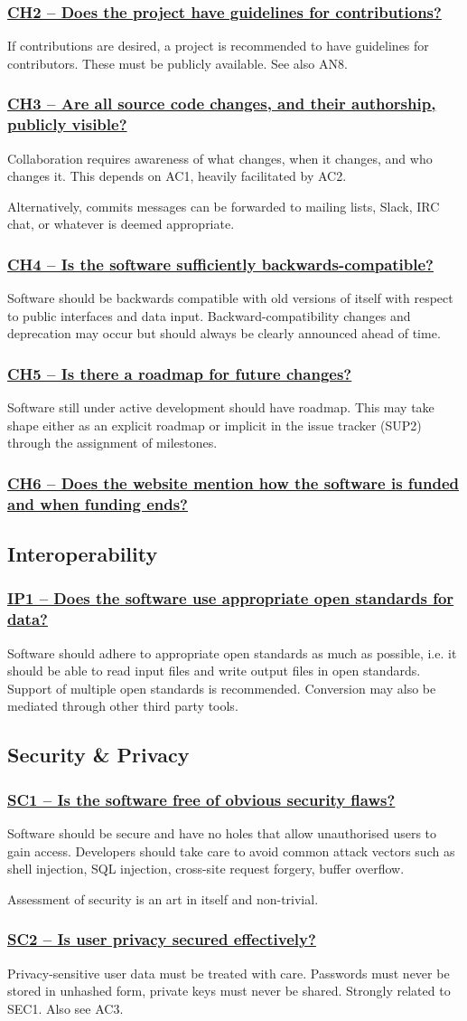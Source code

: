 \documentclass[a4paper,11pt]{article}
\newcommand{\criterion}[1]{\subsubsection*{\underline{#1}}}
\begin{document}
\criterion{CH2 -- Does the project have guidelines for contributions?}

If contributions are desired, a project is recommended to have guidelines for
contributors. These must be publicly available.
See also AN8.

\criterion{CH3 -- Are all source code changes, and their authorship, publicly visible?} 

Collaboration requires awareness of what changes, when it changes, and who
changes it. This depends on AC1, heavily facilitated by AC2.

Alternatively, commits messages can be forwarded to mailing lists, Slack, IRC chat, or
whatever is deemed appropriate.

\criterion{CH4 -- Is the software sufficiently backwards-compatible?}

Software should be backwards compatible with old versions of itself with respect
to public interfaces and data input. Backward-compatibility changes and
deprecation may occur but should always be clearly announced ahead of time.

\criterion{CH5 -- Is there a roadmap for future changes?}

Software still under active development should have roadmap. This may take
shape either as an explicit roadmap or implicit in the issue tracker
(SUP2) through the assignment of milestones.

\criterion{CH6 -- Does the website mention how the software is funded and
when funding ends?}


\subsection{Interoperability}

\criterion{IP1 -- Does the software use appropriate open standards for data?}

Software should adhere to appropriate open standards as much as possible, i.e.
it should be able to read input files and write output files in open
standards. Support of multiple open standards is recommended. Conversion may
also be mediated through other third party tools.

\subsection{Security \& Privacy}

\criterion{SC1 -- Is the software free of obvious security flaws?}

Software should be secure and have no holes that allow unauthorised users to
gain access. Developers should take care to avoid common attack vectors such as shell
injection, SQL injection, cross-site request forgery, buffer overflow. 

Assessment of security is an art in itself and non-trivial. 

\criterion{SC2 -- Is user privacy secured effectively?}

Privacy-sensitive user data must be treated with care. Passwords must never be
stored in unhashed form, private keys must never be shared. Strongly related to
SEC1. Also see AC3.



\end{document}

